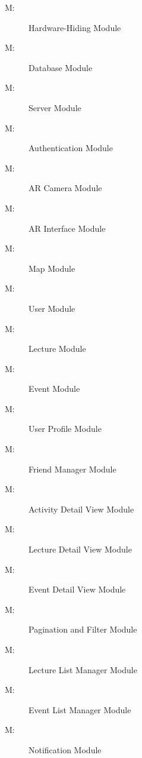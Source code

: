 \documentclass[12pt, titlepage]{article}
\newcounter{mnum}
\newcommand{\mthemnum}{M\themnum}
\begin{document}
\begin{description}
\item [ \mthemnum \label{mHH}:] Hardware-Hiding Module
\item [ \mthemnum \label{mDB}:] Database Module
\item [ \mthemnum \label{mServer}:] Server Module
\item [ \mthemnum \label{mAuth}:] Authentication Module
\item [ \mthemnum \label{mARCamera}:] AR Camera Module
\item [ \mthemnum \label{mARInterface}:] AR Interface Module
\item [ \mthemnum \label{mMap}:] Map Module
\item [ \mthemnum \label{mUser}:] User Module
\item [ \mthemnum \label{mLec}:] Lecture Module
\item [ \mthemnum \label{mEvent}:] Event Module
\item [ \mthemnum \label{mUP}:] User Profile Module
\item [ \mthemnum \label{mFM}:] Friend Manager Module
\item [ \mthemnum \label{mADV}:] Activity Detail View Module
\item [ \mthemnum \label{mLDV}:] Lecture Detail View Module
\item [ \mthemnum \label{mEDV}:] Event Detail View Module
\item [ \mthemnum \label{mPF}:] Pagination and Filter Module
\item [ \mthemnum \label{mLL}:] Lecture List Manager Module
\item [ \mthemnum \label{mEL}:] Event List Manager Module
\item [ \mthemnum \label{mNotify}:] Notification Module
\end{description}
\end{document}

